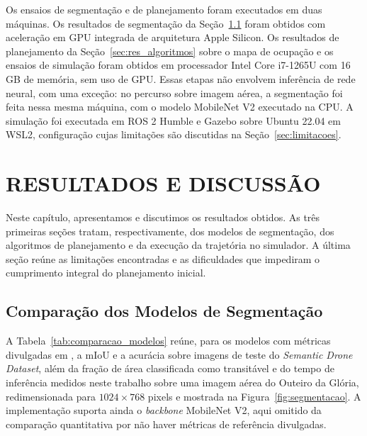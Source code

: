 \documentclass[
    12pt,
    openright,
    oneside,
    a4paper,
    english,
    brazil
]{abntex2}
\begin{document}
Os ensaios de segmentação e de planejamento foram executados em duas máquinas. Os resultados de segmentação da Seção~\ref{sec:res_segmentacao} foram obtidos com aceleração em GPU integrada de arquitetura Apple Silicon. Os resultados de planejamento da Seção~\ref{sec:res_algoritmos} sobre o mapa de ocupação e os ensaios de simulação foram obtidos em processador Intel Core i7-1265U com 16 GB de memória, sem uso de GPU. Essas etapas não envolvem inferência de rede neural, com uma exceção: no percurso sobre imagem aérea, a segmentação foi feita nessa mesma máquina, com o modelo MobileNet V2 executado na CPU. A simulação foi executada em ROS 2 Humble e Gazebo sobre Ubuntu 22.04 em WSL2, configuração cujas limitações são discutidas na Seção~\ref{sec:limitacoes}.

\chapter{RESULTADOS E DISCUSSÃO}
\label{cap:resultados}

Neste capítulo, apresentamos e discutimos os resultados obtidos. As três primeiras seções tratam, respectivamente, dos modelos de segmentação, dos algoritmos de planejamento e da execução da trajetória no simulador. A última seção reúne as limitações encontradas e as dificuldades que impediram o cumprimento integral do planejamento inicial.

\section{Comparação dos Modelos de Segmentação}
\label{sec:res_segmentacao}

A Tabela~\ref{tab:comparacao_modelos} reúne, para os modelos com métricas divulgadas em \cite{junior2024_models}, a mIoU e a acurácia sobre imagens de teste do \emph{Semantic Drone Dataset}, além da fração de área classificada como transitável e do tempo de inferência medidos neste trabalho sobre uma imagem aérea do Outeiro da Glória, redimensionada para $1024 \times 768$ pixels e mostrada na Figura~\ref{fig:segmentacao}. A implementação suporta ainda o \textit{backbone} MobileNet V2, aqui omitido da comparação quantitativa por não haver métricas de referência divulgadas.
\end{document}
